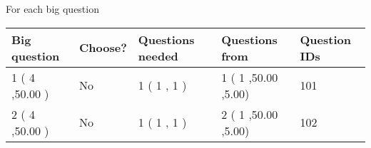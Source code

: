 \documentclass[12pt]{article}
\begin{document}
   
 \newpage
   
{\LARGE{For each big question}}
   
   
\vspace{0.2in}
   
   
\noindent\hspace{-0.4in}\begin{tabular}{|l|l|l|l|l|}
\hline
 Big question & Choose? & Questions needed & Questions from & Question IDs \\ 
\hline
 1 ( 4 ,50.00
 ) &  No   & 
 1 ( 1 ,  1 ) &  1 ( 1
,50.00
 ,5.00) &  101  \\
 \hline
 2 ( 4 ,50.00
 ) &  No   & 
 1 ( 1 ,  1 ) &  2 ( 1
,50.00
 ,5.00) &  102  \\
 \hline
 \end{tabular}
 
 
\end{document}
